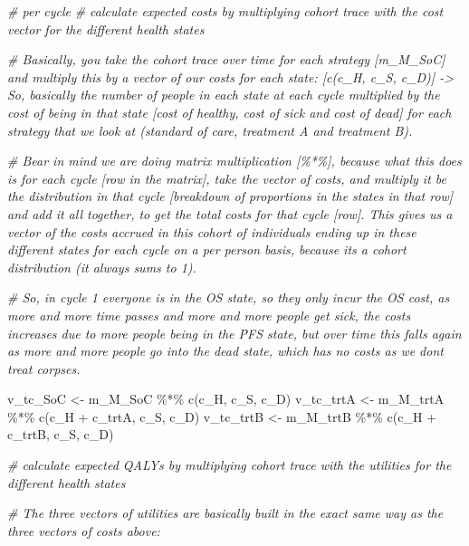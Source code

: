 \documentclass[
]{article}
\newenvironment{Shaded}{\begin{snugshade}}{\end{snugshade}}
\newcommand{\CommentTok}[1]{\textcolor[rgb]{0.56,0.35,0.01}{\textit{#1}}}
\newcommand{\FunctionTok}[1]{\textcolor[rgb]{0.00,0.00,0.00}{#1}}
\newcommand{\NormalTok}[1]{#1}
\newcommand{\OtherTok}[1]{\textcolor[rgb]{0.56,0.35,0.01}{#1}}
\newcommand{\SpecialCharTok}[1]{\textcolor[rgb]{0.00,0.00,0.00}{#1}}
\begin{document}
\begin{Shaded}
\begin{Highlighting}[]
\CommentTok{\# per cycle}
\CommentTok{\# calculate expected costs by multiplying cohort trace with the cost vector for the different health states}

\CommentTok{\# Basically, you take the cohort trace over time for each strategy [m\_M\_SoC] and multiply this by a vector of our costs for each state: [c(c\_H, c\_S, c\_D)] {-}\textgreater{} So, basically the number of people in each state at each cycle multiplied by the cost of being in that state [cost of healthy, cost of sick and cost of dead] for each strategy that we look at (standard of care, treatment A and treatment B).}

\CommentTok{\# Bear in mind we are doing matrix multiplication [\%*\%], because what this does is for each cycle [row in the matrix], take the vector of costs, and multiply it be the distribution in that cycle [breakdown of proportions in the states in that row] and add it all together, to get the total costs for that cycle [row]. This gives us a vector of the costs accrued in this cohort of individuals ending up in these different states for each cycle on a per person basis, because it\textquotesingle{}s a cohort distribution (it always sums to 1).}

\CommentTok{\# So, in cycle 1 everyone is in the OS state, so they only incur the OS cost, as more and more time passes and more and more people get sick, the costs increases due to more people being in the PFS state, but over time this falls again as more and more people go into the dead state, which has no costs as we don\textquotesingle{}t treat corpses.}

\NormalTok{v\_tc\_SoC  }\OtherTok{\textless{}{-}}\NormalTok{ m\_M\_SoC  }\SpecialCharTok{\%*\%} \FunctionTok{c}\NormalTok{(c\_H, c\_S, c\_D)  }
\NormalTok{v\_tc\_trtA }\OtherTok{\textless{}{-}}\NormalTok{ m\_M\_trtA }\SpecialCharTok{\%*\%} \FunctionTok{c}\NormalTok{(c\_H }\SpecialCharTok{+}\NormalTok{ c\_trtA, c\_S, c\_D)  }
\NormalTok{v\_tc\_trtB }\OtherTok{\textless{}{-}}\NormalTok{ m\_M\_trtB }\SpecialCharTok{\%*\%} \FunctionTok{c}\NormalTok{(c\_H }\SpecialCharTok{+}\NormalTok{ c\_trtB, c\_S, c\_D)  }

\CommentTok{\# calculate expected QALYs by multiplying cohort trace with the utilities for the different health states }

\CommentTok{\# The three vectors of utilities are basically built in the exact same way as the three vectors of costs above:}


\end{Highlighting}
\end{Shaded}
\end{document}

